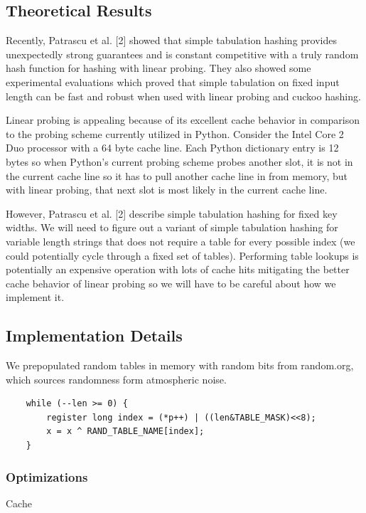 \documentclass[12pt]{article}
\begin{document}
\subsection{Theoretical Results}
Recently, Patrascu et al. [2] showed that simple tabulation hashing provides unexpectedly strong guarantees and is constant competitive with a truly random hash function for hashing with linear probing. They also showed some experimental evaluations which proved that simple tabulation on fixed input length can be fast and robust when used with linear probing and cuckoo hashing. 

Linear probing is appealing because of its excellent cache behavior in comparison to the probing scheme currently utilized in Python.  Consider the Intel Core 2 Duo processor with a 64 byte cache line.  Each Python dictionary entry is 12 bytes so when Python’s current probing scheme probes another slot, it is not in the current cache line so it has to pull another cache line in from memory, but with linear probing, that next slot is most likely in the current cache line.

However, Patrascu et al. [2] describe simple tabulation hashing for fixed key widths.  We will need to figure out a variant of simple tabulation hashing for variable length strings that does not require a table for every possible index (we could potentially cycle through a fixed set of tables).  Performing table lookups is potentially an expensive operation with lots of cache hits mitigating the better cache behavior of linear probing so we will have to be careful about how we implement it.

\subsection{Implementation Details}
We prepopulated random tables in memory with random bits from random.org, which sources randomness form atmospheric noise.
       
       \begin{verbatim}
    while (--len >= 0) {
        register long index = (*p++) | ((len&TABLE_MASK)<<8);
        x = x ^ RAND_TABLE_NAME[index];
    }
       \end{verbatim}

\subsubsection{Optimizations}

Cache       
\end{document}
